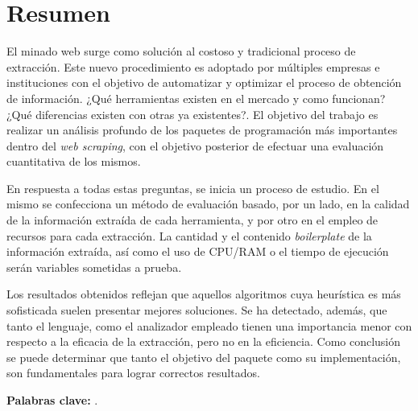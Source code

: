 \chapter*{Resumen}
\label{cha:resumen}


El minado web surge como solución al costoso y tradicional proceso de extracción. Este nuevo procedimiento 
es adoptado por múltiples empresas e instituciones con el objetivo de automatizar y optimizar el proceso 
de obtención de información. ¿Qué herramientas existen en el mercado y como funcionan? ¿Qué diferencias
existen con otras ya existentes?. El objetivo del trabajo es realizar un análisis profundo de los paquetes
de programación más importantes dentro del \emph{web scraping}, con el objetivo posterior de efectuar una
evaluación cuantitativa de los mismos.

En respuesta a todas estas preguntas, se inicia un proceso de estudio. En el mismo se confecciona un método
de evaluación basado, por un lado, en la calidad de la información extraída de cada herramienta, y por 
otro en el empleo de recursos para cada extracción. La cantidad y el contenido \emph{boilerplate} de la 
información extraída, así como el uso de CPU/RAM o el tiempo de ejecución serán variables sometidas a prueba.

Los resultados obtenidos reflejan que aquellos algoritmos cuya heurística es más sofisticada suelen
presentar mejores soluciones. Se ha detectado, además, que tanto el lenguaje, como el analizador empleado
tienen una importancia menor con respecto a la eficacia de la extracción, pero no en la eficiencia. Como
conclusión se puede determinar que tanto el objetivo del paquete como su implementación, son fundamentales
para lograr correctos resultados.

\textbf{Palabras clave:} \mybookpalabrasclave.